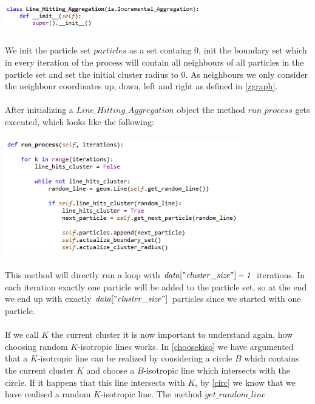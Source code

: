 \documentclass[12pt,a4paper]{scrartcl}
\numberwithin{equation}{subsection}
\newcommand{\1}{\mathbbm{1}}
\numberwithin{equation}{section}
\theoremstyle{definition}
\begin{document}
\\
\includegraphics[height=1.1cm]{images/code-snippets/lhainit.png} \\
\\
We init the particle set $\mathit{particles}$ as a set containg $0$, init the boundary set which in every iteration of the process will contain all neighbours of all particles in the particle set and set the initial cluster radius to $0$. As neighbours we only consider the neighbour coordinates up, down, left and right as defined in \ref{zgraph}. \\
\\After initializing a $\mathit{Line\_Hitting\_Aggregation}$ object the method $\mathit{run\_process}$ gets executed, which looks like the following: \\
\\
\includegraphics[height=5cm]{images/code-snippets/runprocess.png} \\
\\
This method will directly run a loop with $\mathit{data["cluster\_size"] - 1}$ iterations. In each iteration exactly one particle will be added to the particle set, so at the end we end up with exactly $\mathit{data["cluster\_size"]}$ particles since we started with one particle. \\
\\If we call $K$ the current cluster it is now important to understand again, how choosing random $K$-isotropic lines works. In \ref{choosekiso} we have argumented that a $K$-isotropic line can be realized by considering a circle $B$ which contains the current cluster $K$ and choose a $B$-isotropic line which intersects with the circle. If it happens that this line intersects with $K$, by \ref{circ} we know that we have realised a random $K$-isotropic line. The method $\mathit{get\_random\_line}$ \\
\end{document}
